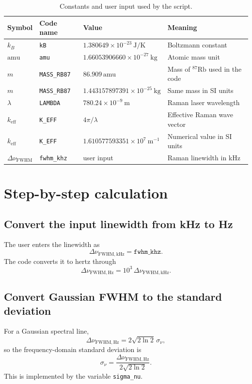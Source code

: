 \documentclass[11pt]{article}
\begin{document}
\begin{table}[h]
\centering
\begin{tabular}{llll}
\hline
Symbol & Code name & Value & Meaning \\
\hline
$k_B$ & \texttt{kB} & $1.380649 \times 10^{-23}\ \mathrm{J/K}$ & Boltzmann constant \\
$\mathrm{amu}$ & \texttt{amu} & $1.66053906660 \times 10^{-27}\ \mathrm{kg}$ & Atomic mass unit \\
$m$ & \texttt{MASS\_RB87} & $86.909\,\mathrm{amu}$ & Mass of $^{87}\mathrm{Rb}$ used in the code \\
$m$ & \texttt{MASS\_RB87} & $1.443157897391 \times 10^{-25}\ \mathrm{kg}$ & Same mass in SI units \\
$\lambda$ & \texttt{LAMBDA} & $780.24 \times 10^{-9}\ \mathrm{m}$ & Raman laser wavelength \\
$k_{\mathrm{eff}}$ & \texttt{K\_EFF} & $4\pi/\lambda$ & Effective Raman wave vector \\
$k_{\mathrm{eff}}$ & \texttt{K\_EFF} & $1.610577593351 \times 10^{7}\ \mathrm{m^{-1}}$ & Numerical value in SI units \\
$\Delta \nu_{\mathrm{FWHM}}$ & \texttt{fwhm\_khz} & user input & Raman linewidth in kHz \\
\hline
\end{tabular}
\caption{Constants and user input used by the script.}
\label{tab:params}
\end{table}

\section{Step-by-step calculation}
\subsection{Convert the input linewidth from kHz to Hz}
The user enters the linewidth as
\begin{equation}
\Delta \nu_{\mathrm{FWHM,kHz}} = \texttt{fwhm\_khz}.
\end{equation}
The code converts it to hertz through
\begin{equation}
\Delta \nu_{\mathrm{FWHM,Hz}} = 10^3\,\Delta \nu_{\mathrm{FWHM,kHz}}.
\end{equation}

\subsection{Convert Gaussian FWHM to the standard deviation}
For a Gaussian spectral line,
\begin{equation}
\Delta \nu_{\mathrm{FWHM,Hz}} = 2\sqrt{2\ln 2}\,\sigma_\nu,
\end{equation}
so the frequency-domain standard deviation is
\begin{equation}
\sigma_\nu = \frac{\Delta \nu_{\mathrm{FWHM,Hz}}}{2\sqrt{2\ln 2}}.
\end{equation}
This is implemented by the variable \texttt{sigma\_nu}.
\end{document}
